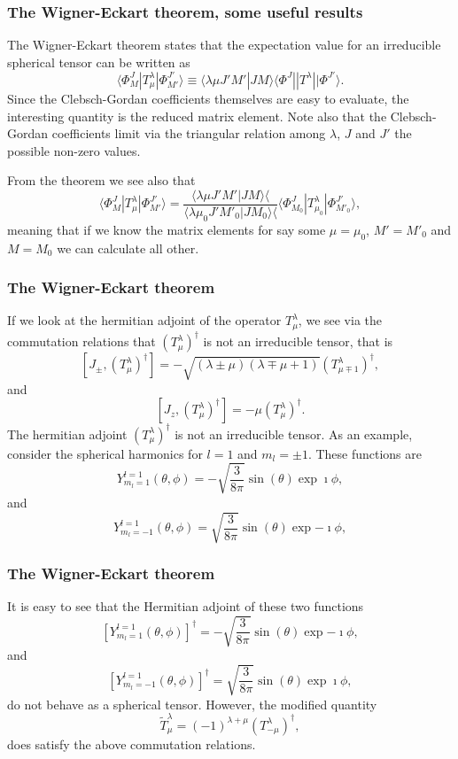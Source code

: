 \documentclass[compress]{beamer}
\begin{document}
\frame
{
\frametitle{The Wigner-Eckart theorem, some useful results}
\begin{small}
{\scriptsize
The Wigner-Eckart theorem states that the  expectation value for an irreducible spherical tensor can be written as
\[
\langle \Phi^J_M|T^{\lambda}_{\mu}|\Phi^{J'}_{M'}\rangle\equiv\langle \lambda \mu J'M'|JM\rangle\langle \Phi^J||T^{\lambda}||\Phi^{J'}\rangle.
\]
Since the Clebsch-Gordan coefficients themselves are easy to evaluate, the interesting quantity is the reduced matrix element. Note also that 
the Clebsch-Gordan coefficients limit via the triangular relation among $\lambda$, $J$ and $J'$ the possible non-zero values.

From the theorem we see also that 
\[
\langle \Phi^J_M|T^{\lambda}_{\mu}|\Phi^{J'}_{M'}\rangle=\frac{\langle \lambda \mu J'M'|JM\rangle\langle }{\langle \lambda \mu_0 J'M'_0|JM_0\rangle\langle }\langle \Phi^J_{M_0}|T^{\lambda}_{\mu_0}|\Phi^{J'}_{M'_0}\rangle,
\]
meaning that if we know the matrix elements for say some $\mu=\mu_0$, $M'=M'_0$ and $M=M_0$ we can calculate all other. 
}
\end{small}

}


\frame
{
\frametitle{The Wigner-Eckart theorem}
\begin{small}
{\scriptsize
If we look at the hermitian adjoint of the operator $T^{\lambda}_{\mu}$, 
we see via the commutation relations that $(T^{\lambda}_{\mu})^{\dagger}$ is not an irreducible tensor, that is
\[
[J_{\pm}, (T^{\lambda}_{\mu})^{\dagger}]= -\sqrt{(\lambda\pm \mu)(\lambda\mp \mu+1)}(T^{\lambda}_{\mu\mp 1})^{\dagger},
\]
and 
\[
[J_{z}, (T^{\lambda}_{\mu})^{\dagger}]=-\mu (T^{\lambda}_{\mu})^{\dagger}.
\]
The hermitian adjoint $(T^{\lambda}_{\mu})^{\dagger}$ is not an irreducible tensor. As an example, consider the spherical harmonics for 
$l=1$ and $m_l=\pm 1$. These functions are 
\[
Y^{l=1}_{m_l=1}(\theta,\phi)=-\sqrt{\frac{3}{8\pi}}\sin{(\theta)}\exp{\imath\phi},
\]
and 
\[
Y^{l=1}_{m_l=-1}(\theta,\phi)=\sqrt{\frac{3}{8\pi}}\sin{(\theta)}\exp{-\imath\phi},
\]
}
\end{small}

}

\frame
{
\frametitle{The Wigner-Eckart theorem}
\begin{small}
{\scriptsize
It is easy to see that the Hermitian adjoint of these two functions
\[
\left[Y^{l=1}_{m_l=1}(\theta,\phi)\right]^{\dagger}=-\sqrt{\frac{3}{8\pi}}\sin{(\theta)}\exp{-\imath\phi},
\]
and 
\[
\left[Y^{l=1}_{m_l=-1}(\theta,\phi)\right]^{\dagger}=\sqrt{\frac{3}{8\pi}}\sin{(\theta)}\exp{\imath\phi},
\]
do not behave as a spherical tensor. However, the modified quantity 
\[
\tilde{T}^{\lambda}_{\mu}=(-1)^{\lambda+\mu}(T^{\lambda}_{-\mu})^{\dagger},
\]
does satisfy the above commutation relations.
}
\end{small}

}
\end{document}
